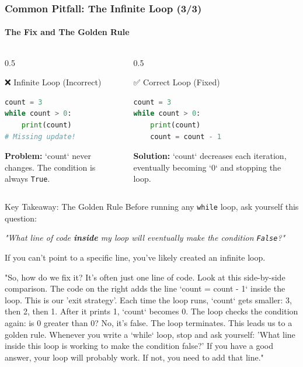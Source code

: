 \documentclass{beamer}
\begin{document}
\begin{frame}[fragile]
    \frametitle{Common Pitfall: The Infinite Loop (3/3)}
    \framesubtitle{The Fix and The Golden Rule}

    \begin{columns}[T]
        \begin{column}{0.5\textwidth}
            \begin{alertblock}{❌ Infinite Loop (Incorrect)}
\begin{lstlisting}[language=Python]
count = 3
while count > 0:
    print(count)
# Missing update!
\end{lstlisting}
            \vspace{0.5em}
            \textbf{Problem:} `count` never changes. The condition is always \texttt{True}.
            \end{alertblock}
        \end{column}
        
        \begin{column}{0.5\textwidth}
            \begin{exampleblock}{✅ Correct Loop (Fixed)}
\begin{lstlisting}[language=Python]
count = 3
while count > 0:
    print(count)
    count = count - 1
\end{lstlisting}
            \vspace{0.5em}
            \textbf{Solution:} `count` decreases each iteration, eventually becoming `0` and stopping the loop.
            \end{exampleblock}
        \end{column}
    \end{columns}
    
    \vspace{1em}
    \begin{block}{Key Takeaway: The Golden Rule}
    Before running any \texttt{while} loop, ask yourself this question:
    \begin{center}
    \textit{"What line of code \textbf{inside} my loop will eventually make the condition \texttt{False}?"}
    \end{center}
    If you can't point to a specific line, you've likely created an infinite loop.
    \end{block}
    
    \begin{note}
    "So, how do we fix it? It's often just one line of code. Look at this side-by-side comparison. The code on the right adds the line `count = count - 1` inside the loop. This is our 'exit strategy'. Each time the loop runs, `count` gets smaller: 3, then 2, then 1. After it prints 1, `count` becomes 0. The loop checks the condition again: is 0 greater than 0? No, it's false. The loop terminates.
    This leads us to a golden rule. Whenever you write a `while` loop, stop and ask yourself: 'What line inside this loop is working to make the condition false?' If you have a good answer, your loop will probably work. If not, you need to add that line."
    \end{note}
\end{frame}
\end{document}

